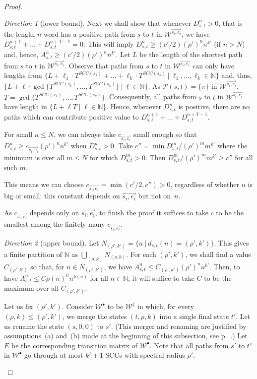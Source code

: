 \documentclass{lmcs}
\theoremstyle{plain}
\theoremstyle{definition}
\theoremstyle{remark}
\newtheorem{dir}{Direction}
\newcommand\waannotated{\wa^\dagger}
\newcommand\period{T}
\newcommand\dgf{d}
\newcommand{\SCC}{\ensuremath{\mathit{SCC}}}
\newcommand\wa{\mathcal{W}}
\begin{document}
\begin{proof}
\begin{dir}[{lower bound}]
Next we shall show that whenever $D_{s,t}^{n}>0$, that is the length $n$ word has a positive path from $s$ to $t$ in $\wa^{\vec{s_i,e_i}}$, we have $D_{s,t}^{n+1} + \dots + D_{s,t}^{n+T-1} = 0$. This will imply $D_{s,t}^n  \ge (c'/2) (\rho')^n n^{k'}$ (if $n > N$)
and, hence, $A_{s,t}^n \ge (c'/2) (\rho')^n n^{k'}$. Let $L$ be the length of  the shortest path from $s$ to  $t$ in $\wa^{\vec{s_i,e_i}}$.
Observe that paths from $s$ to $t$ in $\wa^{\vec{s_i,e_i}}$ can only have lengths from
$\{L + \ell_1 \cdot \period^{\SCC(s_1)} + \dots + \ell_k \cdot \period^{\SCC(s_k)} \ | \ \ell_1, \dots, \ell_k \in \mathbb{N} \}$
and, thus,
$\{L + \ell\cdot \gcd\{\period^{\SCC(s_1)},\dots, \period^{\SCC(s_k)}\} \ | \ \ell\in \mathbb{N} \}$.
As $\mathscr{P}(s,t)=\{\pi\}$ in $\wa^{\vec{s_i,e_i}}$,  $T = \gcd\{\period^{\SCC(s_1)},\dots, \period^{\SCC(s_k)}\}$.
Consequently, all paths from $s$ to $t$ in $\wa^{\vec{s_i,e_i}}$ have length in $\{ L+\ell T\mid \ell \in\mathbb{N}\}$.
Hence,  whenever $D_{s,t}^n$ is positive, there are no paths which can
contribute positive value to $D_{s,t}^{n+1} + \dots + D_{s,t}^{n+T-1}$.

For small $n\le N$, we can always take $c_{\vec{s_i,e_i}}$ small enough so that $D_{s,t}^n \ge c_{\vec{s_i,e_i}}(\rho')^n n^{k'}$ when $D_{s,t}^n > 0$. Take $c'' = \min D^m_{s,t} / (\rho')^m m^{k'}$ where
the minimum is over all $m \le N$ for which $D^m_{s,t} > 0$. Then $D^m_{s,t} / (\rho')^m m^{k'} \ge c''$ for all such $m$.

This means we can choose $c_{\vec{s_i,e_i}} = \min(c'/2, c'') > 0$,
regardless of whether $n$ is big or small:
this constant depends on $\vec{s_i,e_i}$ but not on~$n$.

As $c_{\vec{s_i,e_i}}$ depends only on $\vec{s_i,e_i}$,
to finish the proof it suffices to take $c$
to be the smallest  among the finitely many $c_{\vec{s_i,e_i}}$.
\end{dir}
\begin{dir}[upper bound]
Let $N_{(\rho',k')} = \{n\ |\ \dgf_{s,t}(n) = (\rho',k')\}$. This gives a finite partition of $\mathbb{N}$ as $\bigcup_{(\rho,k)} N_{(\rho,k)}$.
For each $(\rho',k')$, we shall find a value $C_{(\rho',k')}$ so that, for $n \in N_{(\rho',k')}$, we have $A_{s,t}^n \le C_{(\rho',k')} (\rho')^n n^{k'}$.
Then, to have $A_{s,t}^n \le C  \rho(n)^n n^{k(n)}$  for all $n\in \mathbb{N}$, it will suffice to take $C$ to be the maximum  over all $C_{(\rho',k')}$.

Let us fix $(\rho',k')$. Consider $\wa^\bullet$ to be $\waannotated$ in which,  for every $(\rho,k) \le (\rho',k')$, we merge the states $(t,\rho,k)$ into a single final state $t'$.
Let us rename the state $(s,0,0)$ to $s'$.
(This merger and renaming are justified by assumptions~(a) and~(b) made
 at the beginning of this subsection, see p.~\pageref{conp-ub-assumptions}.)
Let $E$ be the corresponding transition matrix of $\wa^\bullet$.
Note that all paths from $s'$ to $t'$ in $\wa^\bullet$ go through at most $k'+1$ SCCs with spectral radius $\rho'$.


\end{dir}
\end{proof}
\end{document}
